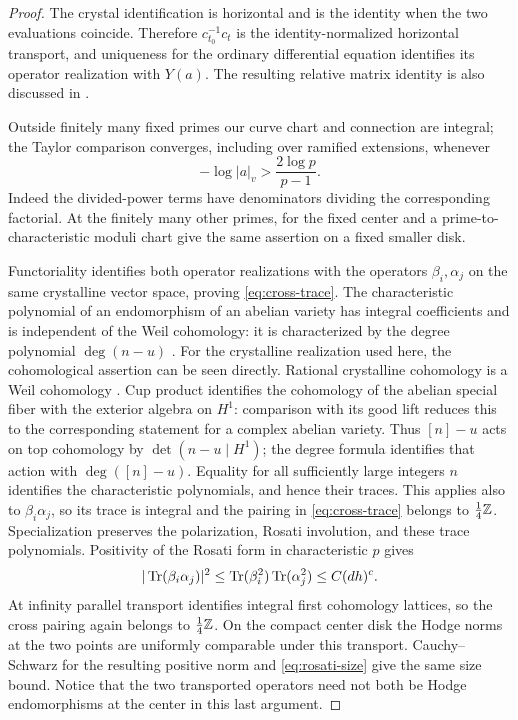 \begin{proof}
The crystal identification is horizontal and is the
identity when the two evaluations coincide.  Therefore
$c_{t_0}^{-1}c_t$ is the identity-normalized horizontal
transport, and uniqueness for the ordinary differential
equation identifies its operator realization with $Y(a)$.
The resulting relative matrix identity is also discussed
in \cite[Theorem~3.4 and Remark~3.6]{PapasI2025}.

Outside finitely many
fixed primes our curve chart and connection are integral; the
Taylor comparison converges, including over ramified extensions,
whenever
\begin{equation}\label{eq:factorial-disk}
 -\log|a|_v>\frac{2\log p}{p-1}.
\end{equation}
Indeed the divided-power terms have denominators dividing the
corresponding factorial.  At the finitely many other primes,
 for the fixed center and a
prime-to-characteristic moduli chart give the same assertion on
a fixed smaller disk.

Functoriality identifies both operator realizations with the
operators $\beta_i,\alpha_j$ on the same crystalline vector
space, proving \eqref{eq:cross-trace}.  The characteristic
polynomial of an endomorphism of an abelian variety has integral
coefficients and is independent of the Weil cohomology: it is
characterized by the degree polynomial $\deg(n-u)$
\cite[Section~12]{Milne1986}.  For the crystalline realization used
here, the cohomological assertion can be seen directly.  Rational
crystalline cohomology is a Weil cohomology
\cite[Remark~4.15]{MaulikPoonen2012}.  Cup product identifies the
cohomology of the abelian special fiber with the exterior algebra on
$H^1$: comparison with its good lift reduces this to the corresponding
statement for a complex abelian variety.  Thus $[n]-u$ acts on top
cohomology by $\det(n-u\mid H^1)$; the degree formula identifies that
action with $\deg([n]-u)$.  Equality for all sufficiently large integers
$n$ identifies the characteristic polynomials, and hence their traces.
This applies
also to $\beta_i\alpha_j$, so its trace is integral and the pairing
in \eqref{eq:cross-trace} belongs to $\tfrac14\mathbb Z$.  Specialization
preserves the polarization, Rosati involution, and these trace
polynomials.  Positivity of the Rosati form in characteristic
$p$ \cite[Theorem~17.3]{Milne1986} gives
\[
 |\operatorname{Tr}(\beta_i\alpha_j)|^2
 \le \operatorname{Tr}(\beta_i^2)\operatorname{Tr}(\alpha_j^2)
 \le C(dh)^c.
\]
At infinity parallel transport identifies integral first
cohomology lattices, so the cross pairing again belongs to
$\tfrac14\mathbb Z$.  On
the compact center disk the Hodge norms at the two points are
uniformly comparable under this transport.  Cauchy--Schwarz for
the resulting positive norm and \eqref{eq:rosati-size} give the
same size bound.  Notice that the two transported operators need
not both be Hodge endomorphisms at the center in this last argument.
\end{proof}


